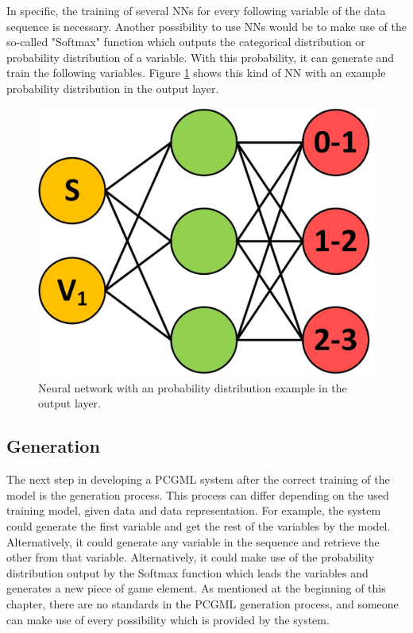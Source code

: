 \documentclass[MGS,Master,english]{twbook}%
\begin{document}
In specific, the training of several \acp{NN} for every following variable of the data sequence is necessary. Another possibility to use \acp{NN} would be to make use of the so-called "Softmax" function which outputs the categorical distribution or probability distribution of a variable. With this probability, it can generate and train the following variables. Figure \ref{fig::PCGML::devExample::NNwithSoftmax} shows this kind of NN with an example probability distribution in the output layer.
\begin{figure}[!htbp]
	\centering
	\includegraphics[width=0.3\linewidth]{PICs/NNs/PCGML_development_example_NN_categorical_distributions}
	\caption{Neural network with an probability distribution example in the output layer.}\label{fig::PCGML::devExample::NNwithSoftmax}
\end{figure}


\subsection{Generation}
The next step in developing a PCGML system after the correct training of the model is the generation process. This process can differ depending on the used training model, given data and data representation. For example, the system could generate the first variable and get the rest of the variables by the model. Alternatively, it could generate any variable in the sequence and retrieve the other from that variable. Alternatively, it could make use of the probability distribution output by the Softmax function which leads the variables and generates a new piece of game element. As mentioned at the beginning of this chapter, there are no standards in the PCGML generation process, and someone can make use of every possibility which is provided by the system.
 
%
%
\clearpage
\end{document}
